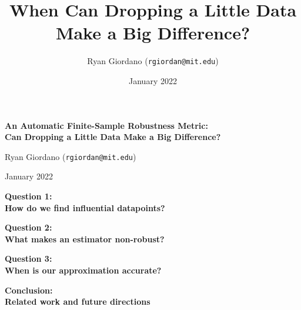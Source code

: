 \documentclass[10pt]{beamer}
\title{When Can Dropping a Little Data Make a Big Difference?}
\author{Ryan Giordano (\texttt{rgiordan@mit.edu})}
\date{January 2022}
\begin{document}

\begin{frame}

\begin{center}
\large
\textbf{
An Automatic Finite-Sample Robustness Metric:
\\Can Dropping a Little Data Make a Big Difference?}
\end{center}

\hrulefill

Ryan Giordano (\texttt{rgiordan@mit.edu})\footnotemark[1]

January 2022


\end{frame}



\begin{frame}{}

{\Large \textbf{Question 1:} \\ \vspace{0.5em}
\textbf{How do we find influential datapoints?}}

\end{frame}



\begin{frame}{}

{\Large \textbf{Question 2:} \\ \vspace{0.5em}
\textbf{What makes an estimator non-robust?}}

\end{frame}

% 

\begin{frame}{}

{\Large \textbf{Question 3:} \\ \vspace{0.5em}
\textbf{When is our approximation accurate?}}

\end{frame}

% 

\begin{frame}{}

{\Large \textbf{Conclusion: \\Related work and future directions} }

\end{frame}
\end{document}
